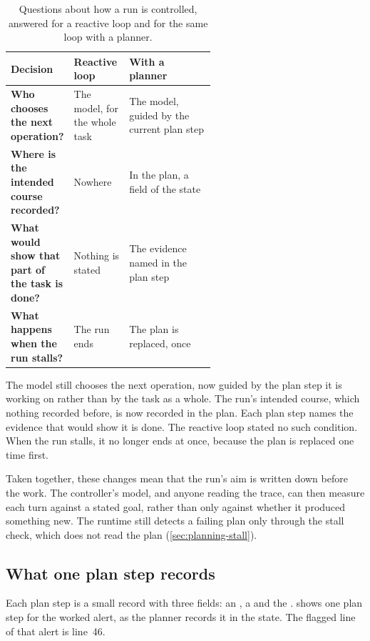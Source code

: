 \begin{table}[htbp]
  \caption{Questions about how a run is controlled, answered for a reactive loop and for the same
  loop with a planner.}
  \label{tab:planning-decisions}
  \begin{adjustbox}{width=\linewidth}\begin{tabularx}{\linewidth}{L{0.30\linewidth}L{0.27\linewidth}X}
    \toprule
    \textbf{Decision} & \textbf{Reactive loop} & \textbf{With a planner} \\
    \midrule
    \textbf{Who chooses the next operation?} & The model, for the whole task & The model, guided by
      the current plan step \\ \addlinespace
    \textbf{Where is the intended course recorded?} & Nowhere & In the plan, a field of the state \\
      \addlinespace
    \textbf{What would show that part of the task is done?} & Nothing is stated & The evidence named
      in the plan step \\ \addlinespace
    \textbf{What happens when the run stalls?} & The run ends & The plan is replaced, once \\
    \bottomrule
  \end{tabularx}\end{adjustbox}
\end{table}

The model still chooses the next operation, now guided by the plan step it is working on rather than
by the task as a whole. The run's intended course, which nothing recorded before, is now recorded in
the plan. Each plan step names the evidence that would show it is done. The reactive loop stated no
such condition. When the run stalls, it no longer ends at once, because the plan is replaced one time
first.

Taken together, these changes mean that the run's aim is written down before the work. The
controller's model, and anyone reading the trace, can then measure each turn against a stated goal,
rather than only against whether it produced something new. The runtime still detects a failing plan
only through the stall check, which does not read the plan (\cref{sec:planning-stall}).

\subsection{What one plan step records}
\label{sec:planning-step}

Each plan step is a small record with three fields: an , a  and the
.  shows one plan step for the worked alert, as the planner
records it in the state. The flagged line of that alert is line~46.

